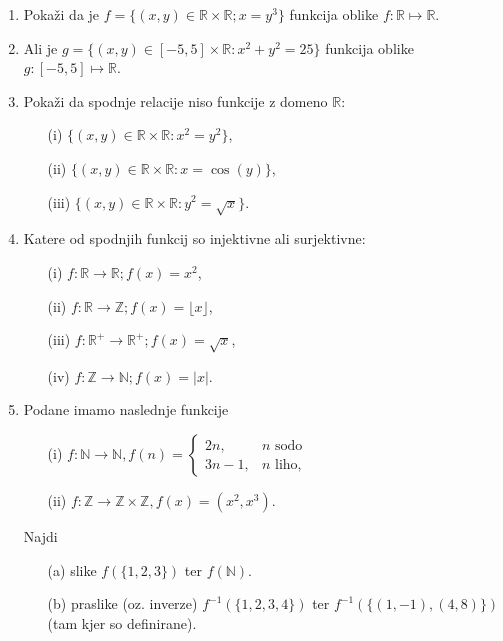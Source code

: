 \documentclass[11pt,paper=b5,footinclude,headinclude]{scrbook} %
\begin{document}
\begin{enumerate}
(e) Ali je $g \circ f$ surjektivna?


\item Pokaži da je  $f=\{(x,y)\in \mathbb{R}\times \mathbb{R}; x= y^3\}$ funkcija oblike  $f:\mathbb{R}\mapsto \mathbb{R}$. 

\item Ali je $g= \{(x,y)\in [-5,5]\times \mathbb{R}: x^2 + y^2 = 25 \}$ funkcija oblike  $g:[-5,5]\mapsto \mathbb{R}$.
\item Pokaži da spodnje relacije niso funkcije z domeno $\mathbb{R}$:
\begin{enumerate}
\item[(i)] $\{(x,y)\in \mathbb{R}\times \mathbb{R}: x^2 = y^2 \}$,
\item[(ii)] $\{(x,y)\in \mathbb{R}\times \mathbb{R}: x = \cos(y) \}$,
\item[(iii)] $\{(x,y)\in \mathbb{R}\times \mathbb{R}: y^2 = \sqrt{x} \}$.
\end{enumerate}


\item Katere od spodnjih funkcij so injektivne ali surjektivne:
\begin{enumerate}
\item[(i)] $f\colon \mathbb{R} \to \mathbb{R}; f(x) = x^2$,
\item[(ii)] $f\colon \mathbb{R} \to \mathbb{Z}; f(x) =\lfloor x\rfloor$,
\item[(iii)] $f\colon \mathbb{R}^+ \to \mathbb{R}^+; f(x) =\sqrt{x}$,
\item[(iv)] $f\colon \mathbb{Z} \to \mathbb{N}; f(x) = |x|$.
\end{enumerate}
\item Podane imamo naslednje funkcije
\begin{enumerate}
\item[(i)] $f\colon \mathbb{N} \to \mathbb{N}, f(n) =    \begin{cases}
      2n,& n \textrm{ sodo } \\
      3n -1,& n \textrm{ liho},
    \end{cases}$
\item[(ii)] $f\colon \mathbb{Z}  \to \mathbb{Z}\times \mathbb{Z} , f(x) = (x^2, x^3)$.
\end{enumerate}
Najdi
\begin{enumerate}
\item[(a)]  slike $f(\{1,2,3\})$ ter $f(\mathbb{N})$.
\item[(b)]   praslike (oz. inverze) $f^{-1}(\{1,2,3,4\})$ ter $f^{-1}(\{(1,-1), (4,8)\})$ (tam kjer so definirane).
\end{enumerate}



\end{enumerate}
\end{document}
